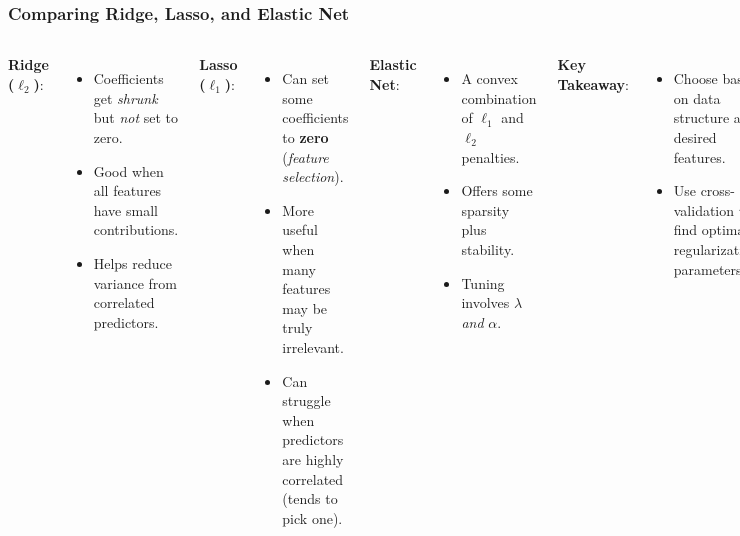 \documentclass[aspectratio=169]{beamer}
\begin{document}
\begin{frame}
    \frametitle{Comparing Ridge, Lasso, and Elastic Net}
    \begin{columns}
        \textbf{Ridge (\(\ell_2\))}: 
        \begin{itemize}
            \item Coefficients get \textit{shrunk} but \emph{not} set to zero.
            \item Good when all features have small contributions.
            \item Helps reduce variance from correlated predictors.
        \end{itemize}
        
        \textbf{Lasso (\(\ell_1\))}:
        \begin{itemize}
            \item Can set some coefficients to \textbf{zero} (\textit{feature selection}).
            \item More useful when many features may be truly irrelevant.
            \item Can struggle when predictors are highly correlated (tends to pick one).
        \end{itemize}
        \textbf{Elastic Net}:
        \begin{itemize}
            \item A convex combination of \(\ell_1\) and \(\ell_2\) penalties.
            \item Offers some sparsity plus stability.
            \item Tuning involves \(\lambda\) \emph{and} \(\alpha\).
        \end{itemize}
        \vspace{0.5em}
        \textbf{Key Takeaway}: 
        \begin{itemize}
            \item Choose based on data structure and desired features.
            \item Use cross-validation to find optimal regularization parameters.
        \end{itemize}
    \end{columns}
\end{frame}
\end{document}
